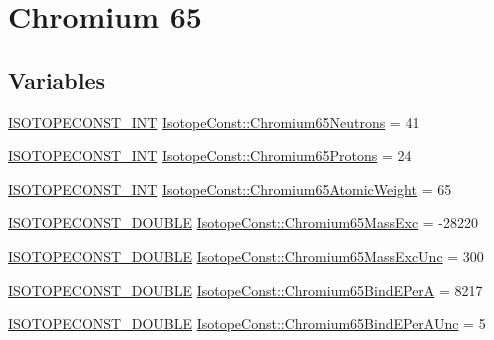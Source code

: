 \hypertarget{group___isotope_const-_chromium-_cr65}{}\section{Chromium 65}
\label{group___isotope_const-_chromium-_cr65}
\subsection*{Variables}
\begin{DoxyCompactItemize}
\item 
\mbox{\hyperlink{group___isotope_const-_macros_ga5f18360b3e99483a35c32d789e62621c}{I\+S\+O\+T\+O\+P\+E\+C\+O\+N\+S\+T\+\_\+\+I\+NT}} \mbox{\hyperlink{group___isotope_const-_chromium-_cr65_gaea658fe51a04db4c70cce9ae8e347965}{Isotope\+Const\+::\+Chromium65\+Neutrons}} = 41
\item 
\mbox{\hyperlink{group___isotope_const-_macros_ga5f18360b3e99483a35c32d789e62621c}{I\+S\+O\+T\+O\+P\+E\+C\+O\+N\+S\+T\+\_\+\+I\+NT}} \mbox{\hyperlink{group___isotope_const-_chromium-_cr65_gadbc5140dd85912a84aa2f4d8e5a45f9f}{Isotope\+Const\+::\+Chromium65\+Protons}} = 24
\item 
\mbox{\hyperlink{group___isotope_const-_macros_ga5f18360b3e99483a35c32d789e62621c}{I\+S\+O\+T\+O\+P\+E\+C\+O\+N\+S\+T\+\_\+\+I\+NT}} \mbox{\hyperlink{group___isotope_const-_chromium-_cr65_gaa58f05513adc01178df5a84c02ef4284}{Isotope\+Const\+::\+Chromium65\+Atomic\+Weight}} = 65
\item 
\mbox{\hyperlink{group___isotope_const-_macros_ga8f45a7272ce02c0b4c65c44636ed719a}{I\+S\+O\+T\+O\+P\+E\+C\+O\+N\+S\+T\+\_\+\+D\+O\+U\+B\+LE}} \mbox{\hyperlink{group___isotope_const-_chromium-_cr65_ga5904a9e5ccf9bba7eed3dab5ec0e9135}{Isotope\+Const\+::\+Chromium65\+Mass\+Exc}} = -\/28220
\item 
\mbox{\hyperlink{group___isotope_const-_macros_ga8f45a7272ce02c0b4c65c44636ed719a}{I\+S\+O\+T\+O\+P\+E\+C\+O\+N\+S\+T\+\_\+\+D\+O\+U\+B\+LE}} \mbox{\hyperlink{group___isotope_const-_chromium-_cr65_gacabe0ecd9b92e6bba7761bc341539d3f}{Isotope\+Const\+::\+Chromium65\+Mass\+Exc\+Unc}} = 300
\item 
\mbox{\hyperlink{group___isotope_const-_macros_ga8f45a7272ce02c0b4c65c44636ed719a}{I\+S\+O\+T\+O\+P\+E\+C\+O\+N\+S\+T\+\_\+\+D\+O\+U\+B\+LE}} \mbox{\hyperlink{group___isotope_const-_chromium-_cr65_ga2a767013aa30f48d9e5ef3131f32e2db}{Isotope\+Const\+::\+Chromium65\+Bind\+E\+PerA}} = 8217
\item 
\mbox{\hyperlink{group___isotope_const-_macros_ga8f45a7272ce02c0b4c65c44636ed719a}{I\+S\+O\+T\+O\+P\+E\+C\+O\+N\+S\+T\+\_\+\+D\+O\+U\+B\+LE}} \mbox{\hyperlink{group___isotope_const-_chromium-_cr65_ga85593c6351adc326e7d1bfcef24f9985}{Isotope\+Const\+::\+Chromium65\+Bind\+E\+Per\+A\+Unc}} = 5

\end{DoxyCompactItemize}
